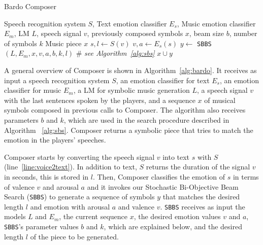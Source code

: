 \begin{algorithm}[t]
\caption{Bardo Composer}
\label{alg:bardo}
\begin{algorithmic}[1]
\REQUIRE Speech recognition system $S$, Text emotion classifier $E_s$, Music emotion classifier $E_m$, LM $L$, speech signal $v$, previously composed symbols $x$, beam size $b$, number of symbols $k$
\ENSURE Music piece $x$
\STATE $s, l \gets S(v)$ \label{line:voice2text}
\STATE $v, a \gets E_s(s)$ \label{line:emotion_classification}
\STATE $y \gets$ \texttt{SBBS}$(L, E_m, x, v, a, b, k, l)$ \# \emph{see Algorithm~\ref{alg:sbs}} \label{line:sbs}
\RETURN $x \cup y$ \label{line:generation2}
\end{algorithmic}
\end{algorithm}

A general overview of Composer is shown in Algorithm~\ref{alg:bardo}. It receives as input a speech recognition system $S$, an emotion classifier for text $E_s$, an emotion classifier for music $E_m$, a LM for symbolic music generation $L$, a speech signal $v$ with the last sentences spoken by the players, and a sequence $x$ of musical symbols composed in previous calls to Composer. The algorithm also receives parameters $b$ and $k$, which are used in the search procedure described in Algorithm
~\ref{alg:sbs}. Composer returns a symbolic piece that tries to match the emotion in the players' speeches.

Composer starts by converting the speech signal $v$ into text $s$ with $S$ (line~\ref{line:voice2text}). In addition to text, $S$ returns the duration of the signal $v$ in seconds, this is stored in $l$. Then, Composer classifies the emotion of $s$ in terms of valence $v$ and arousal $a$ and it
invokes our Stochastic Bi-Objective Beam Search (\texttt{SBBS}) to generate a sequence of symbols $y$ that matches the desired length $l$ and emotion with arousal $a$ and valence $v$.
\texttt{SBBS} receives as input the models $L$ and $E_m$, the current sequence $x$, the desired emotion values $v$ and $a$, \texttt{SBBS}'s parameter values $b$ and $k$, which are explained below, and the desired length $l$ of the piece to be generated. %

